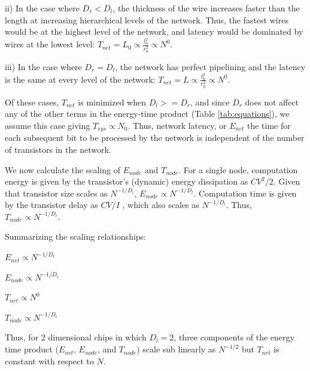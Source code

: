 \documentclass[12pt]{article}
\begin{document}
ii) In the case where $D_r < D_l$, the thickness of the wire increases faster than the length at increasing
hierarchical levels of the network.  Thus, the fastest wires would be at the highest level
of the network, and latency would be dominated by wires at the lowest level: $T_{net} = L_0 \propto \frac{l_0^2}{r_0^2} \propto N^0$.  

iii) In the case where $D_r = D_l$, the network has perfect pipelining and the latency
is the same at every level of the network: $T_{net} =L \propto \frac{l_0^2}{r_0^2} \propto N^0$.

Of these cases, $T_{net}$ is minimized when $D_l >= D_r$,  and since $D_r$ does not affect any of the other terms in the energy-time product (Table \ref{tab:equations}),  we assume this case giving $T_{sys} \propto N_0$.  Thus, network latency, or $E_{net}$ the time for each subsequent bit to be processed by the network is independent of the number of transistors in the network.



We now calculate the scaling of $E_{node}$ and $T_{node}$. For a single node, computation energy is given by the transistor's 
(dynamic) energy dissipation as $CV^2/2$.  Given that transistor size scales as $N^{-1/D_l}$,
$E_{node} \propto  N^{-1/D_l}$. %
Computation time is given by the 
transistor delay as $CV/I$ \cite{bakoglu90}, which also scales as $N^{-1/D_l}$.  %
Thus, $T_{node} \propto  N^{-1/D_l}$.  

Summarizing the scaling relationships: 

$E_{net} \propto N^{-1/D_l}$

$E_{node} \propto N^{-1/D_l}$

$T_{net} \propto N^0$

$T_{node} \propto N^{-1/D_l}$



Thus, for 2 dimensional chips in which $D_l = 2$, three components of the energy time product ($E_{net}$, $E_{node}$, and $T_{node}$) scale sub linearly as $N^{-1/2}$ but $T_{net}$ is constant with respect to $N$.
\end{document}
